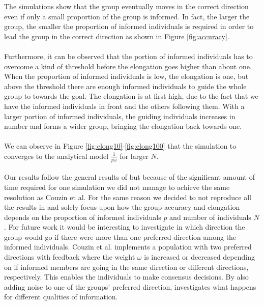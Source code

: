The simulations show that the group eventually moves in the correct direction even if only a small proportion of the group is informed. 
In fact, the larger the group, the smaller the proportion of informed individuals is required in order to lead the group in the correct direction as shown in Figure \ref{fig:accuracy}.
\\\\
Furthermore, it can be observed that the portion of informed individuals has to overcome a kind of threshold before the elongation goes higher than about one. 
When the proportion of informed individuals is low, the elongation is one, but above the threshold there are enough informed individuals to guide the whole group to towards the goal. 
The elongation is at first high, due to the fact that we have the informed individuals in front and the others following them. 
With a larger portion of informed individuals, the guiding individuals increases in number and forms a wider group, bringing the elongation back towards one.
\\\\
We can observe in Figure \ref{fig:elong10}-\ref{fig:elong100} that the simulation to converges to the analytical model $\frac{1}{p\omega}$ for larger $N$.
\\\\
Our results follow the general results of \cite{theArticle} but because of the significant amount of time required for one simulation we did not manage to achieve the same resolution as Couzin et al. For the same reason we decided to not reproduce all the results in \cite{theArticle} and solely focus upon how the group accuracy and elongation depends on the proportion of informed individuals $p$ and number of individuals $N$. For future work it would be interesting to investigate in which direction the group would go if there were more than one preferred direction among the informed individuals. Couzin et al. implements a population with two preferred directions with feedback where the weight $\omega$ is increased or decreased depending on if informed members are going in the same direction or different directions, respectively. This enables the individuals to make consensus decisions. By also adding noise to one of the groups' preferred direction, \cite{theArticle} investigates what happens for different qualities of information.